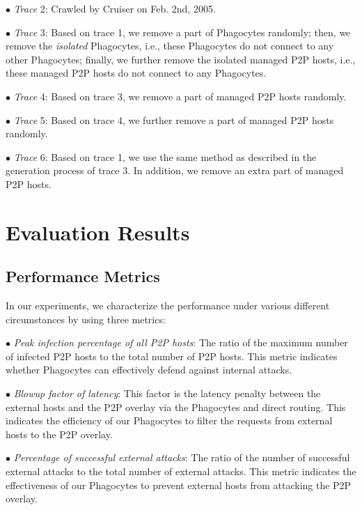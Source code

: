 \documentclass[times,10pt,twocolumn]{article}
\begin{document}
$\bullet$ \emph{Trace} 2: Crawled by Cruiser on Feb. 2nd, 2005.

$\bullet$ \emph{Trace} 3: Based on trace 1, we remove a part of
Phagocytes randomly; then, we remove the \emph{isolated} Phagocytes,
i.e., these Phagocytes do not connect to any other Phagocytes;
finally, we further remove the isolated managed P2P hosts, i.e.,
these managed P2P hosts do not connect to any Phagocytes.

$\bullet$ \emph{Trace} 4: Based on trace 3, we remove a part of
managed P2P hosts randomly.

$\bullet$ \emph{Trace} 5: Based on trace 4, we further remove a part
of managed P2P hosts randomly.

$\bullet$ \emph{Trace} 6: Based on trace 1, we use the same method
as described in the generation process of trace 3. In addition, we
remove an extra part of managed P2P hosts.





\section{Evaluation Results}
\label{sec:ExResults}



\subsection{Performance Metrics}

In our experiments, we characterize the performance under various
different circumstances by using three metrics:


$\bullet$ \emph{Peak infection percentage of all P2P hosts}: The
ratio of the maximum number of infected P2P hosts to the total
number of P2P hosts. This metric indicates whether Phagocytes can
effectively defend against internal attacks.

$\bullet$ \emph{Blowup factor of latency}: This factor is the
latency penalty between the external hosts and the P2P overlay via
the Phagocytes and direct routing. This indicates the efficiency of
our Phagocytes to filter the requests from external hosts to the P2P
overlay.

$\bullet$ \emph{Percentage of successful external attacks}: The
ratio of the number of successful external attacks to the total
number of external attacks. This metric indicates the effectiveness
of our Phagocytes to prevent external hosts from attacking the P2P
overlay.
\end{document}
